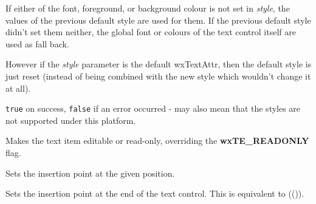 If either of the font, foreground, or background colour is not set in\rtfsp
{\it style}, the values of the previous default style are used for them. If
the previous default style didn't set them neither, the global font or colours
of the text control itself are used as fall back.

However if the {\it style} parameter is the default wxTextAttr, then the
default style is just reset (instead of being combined with the new style which
wouldn't change it at all).




{\tt true} on success, {\tt false} if an error occurred - may also mean that
the styles are not supported under this platform.




\label{wxtextctrlseteditable}


Makes the text item editable or read-only, overriding the {\bf wxTE\_READONLY} flag.






\label{wxtextctrlsetinsertionpoint}


Sets the insertion point at the given position.




\label{wxtextctrlsetinsertionpointend}


Sets the insertion point at the end of the text control. This is equivalent
to (()).


